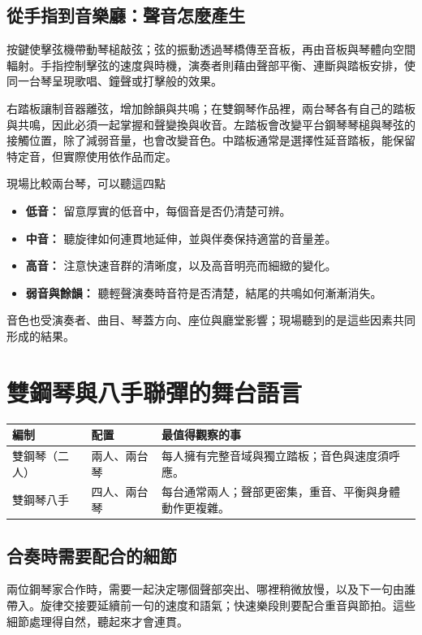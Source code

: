 \documentclass[UTF8,12pt,a4paper,fontset=none]{ctexart}
\begin{document}
\subsection{從手指到音樂廳：聲音怎麼產生}
按鍵使擊弦機帶動琴槌敲弦；弦的振動透過琴橋傳至音板，再由音板與琴體向空間輻射。手指控制擊弦的速度與時機，演奏者則藉由聲部平衡、連斷與踏板安排，使同一台琴呈現歌唱、鐘聲或打擊般的效果。

右踏板讓制音器離弦，增加餘韻與共鳴；在雙鋼琴作品裡，兩台琴各有自己的踏板與共鳴，因此必須一起掌握和聲變換與收音。左踏板會改變平台鋼琴琴槌與琴弦的接觸位置，除了減弱音量，也會改變音色。中踏板通常是選擇性延音踏板，能保留特定音，但實際使用依作品而定。

\begin{listen}{現場比較兩台琴，可以聽這四點}
\begin{itemize}
\item \textbf{低音：} 留意厚實的低音中，每個音是否仍清楚可辨。
\item \textbf{中音：} 聽旋律如何連貫地延伸，並與伴奏保持適當的音量差。
\item \textbf{高音：} 注意快速音群的清晰度，以及高音明亮而細緻的變化。
\item \textbf{弱音與餘韻：} 聽輕聲演奏時音符是否清楚，結尾的共鳴如何漸漸消失。
\end{itemize}
音色也受演奏者、曲目、琴蓋方向、座位與廳堂影響；現場聽到的是這些因素共同形成的結果。
\end{listen}
\clearpage
\section{雙鋼琴與八手聯彈的舞台語言}
\begin{tabularx}{\textwidth}{@{}p{}p{}X@{}}
\toprule
\textbf{編制} & \textbf{配置} & \textbf{最值得觀察的事}\\\midrule
雙鋼琴（二人） & 兩人、兩台琴 & 每人擁有完整音域與獨立踏板；音色與速度須呼應。\\
雙鋼琴八手 & 四人、兩台琴 & 每台通常兩人；聲部更密集，重音、平衡與身體動作更複雜。\\\bottomrule
\end{tabularx}

\subsection{合奏時需要配合的細節}
兩位鋼琴家合作時，需要一起決定哪個聲部突出、哪裡稍微放慢，以及下一句由誰帶入。旋律交接要延續前一句的速度和語氣；快速樂段則要配合重音與節拍。這些細節處理得自然，聽起來才會連貫。
\end{document}
